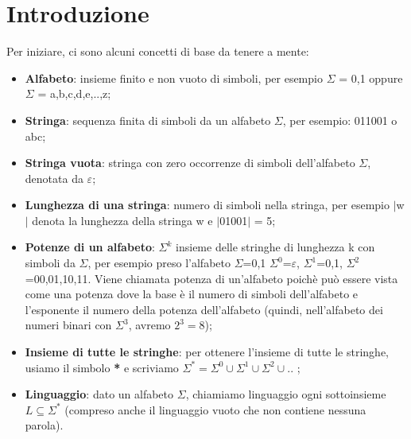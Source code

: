 \chapter{Introduzione}
Per iniziare, ci sono alcuni concetti di base da tenere a mente:

\begin{itemize}

\item \textbf{Alfabeto}: insieme finito e non vuoto di simboli, per esempio
$\Sigma$ = {0,1} oppure $\Sigma$ = {a,b,c,d,e,..,z};
\item \textbf{Stringa}: sequenza finita di simboli da un alfabeto $\Sigma$, per 
esempio: 011001 o abc;
\item \textbf{Stringa vuota}: stringa con zero occorrenze di simboli dell'alfabeto 
$\Sigma$, denotata da $\varepsilon$;
\item \textbf{Lunghezza di una stringa}: numero di simboli nella stringa, per 
esempio $|$w$|$ denota la lunghezza della stringa w e $|$01001$|$ = 5;
\item \textbf{Potenze di un alfabeto}: $\Sigma^{k}$ insieme delle stringhe di 
lunghezza k con simboli da $\Sigma$, per esempio preso l'alfabeto $\Sigma$={0,1}
$\Sigma^{0}$={$\varepsilon$}, $\Sigma^{1}$={0,1}, $\Sigma^{2}$={00,01,10,11}.
Viene chiamata potenza di un'alfabeto poichè può essere vista come una potenza dove 
la base è il numero di simboli dell'alfabeto e l'esponente il numero della potenza
dell'alfabeto (quindi, nell'alfabeto dei numeri binari con $\Sigma^{3}$, avremo
 $2^{3}=8$);
\item \textbf{Insieme di tutte le stringhe}: per ottenere l'insieme di tutte le 
stringhe, usiamo il simbolo \textbf{*} e scriviamo $\Sigma^{*}=\Sigma^{0} \cup 
\Sigma^{1} \cup \Sigma^{2} \cup ..$ ;
\item \textbf{Linguaggio}: dato un alfabeto $\Sigma$, chiamiamo linguaggio ogni
sottoinsieme $L\subseteq\Sigma^{*}$ (compreso anche il linguaggio vuoto che non 
contiene nessuna parola).

\end{itemize}
